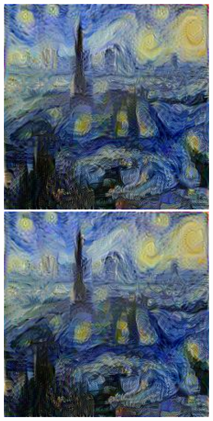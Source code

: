 \documentclass{article}
\begin{document}
\begin{figure}[!htb]
\begin{minipage}{0.2\textwidth}
\end{minipage}%
\begin{minipage}{0.2\textwidth}
\centering
\includegraphics[width=0.98\textwidth]{../Images/transfer/paris_starrynight_w_01_01_06_01_01.jpg}
\end{minipage}%
\begin{minipage}{0.2\textwidth}
\centering
\includegraphics[width=0.98\textwidth]{../Images/transfer/paris_starrynight_w_005_015_02_025_035.jpg}

\end{minipage}
\end{figure}
\end{document}
